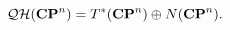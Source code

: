 \begin{equation}
{\cal QH}({\bf CP}^n)=T^*({\bf CP}^n) \oplus N({\bf CP}^n).
\label{adxjqq}
\end{equation}

